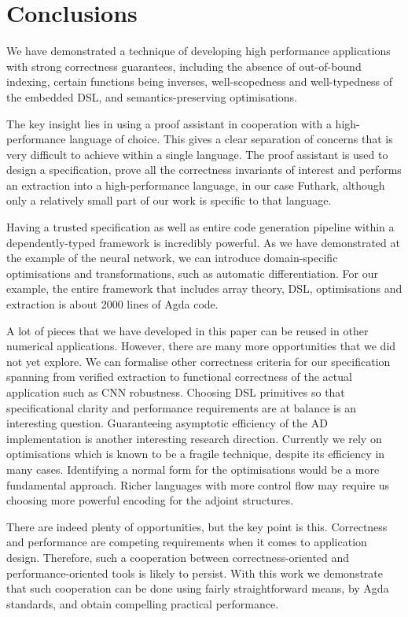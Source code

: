 \section{Conclusions\label{sec:conclusions}}

We have demonstrated a technique of developing high performance
applications with strong correctness guarantees, including the absence
of out-of-bound indexing, certain functions being inverses,
well-scopedness and well-typedness of the embedded DSL, and
semantics-preserving optimisations.

The key insight lies in using a proof assistant in cooperation with a
high-performance language of choice. This gives a clear separation of
concerns that is very difficult to achieve within a single language.
The proof assistant is used to design a specification, prove all the
correctness invariants of interest and performs an extraction into a
high-performance language, in our case Futhark, although only a
relatively small part of our work is specific to that language.

Having a trusted specification as well as entire code generation
pipeline within a dependently-typed framework is incredibly
powerful. As we have demonstrated at the example of the neural
network, we can introduce domain-specific optimisations and
transformations, such as automatic differentiation. For our example,
the entire framework that includes array theory, DSL, optimisations
and extraction is about 2000 lines of Agda code.

A lot of pieces that we have developed in this paper can be reused in
other numerical applications. However, there are many more
opportunities that we did not yet explore. We can formalise other
correctness criteria for our specification spanning from verified
extraction to functional correctness of the actual application such
as CNN robustness.
Choosing DSL primitives so that specificational clarity and
performance requirements are at balance is an interesting question.
Guaranteeing asymptotic efficiency of the AD implementation is another
interesting research direction.  Currently we rely on
optimisations which is known to be a fragile technique, despite its efficiency 
in many cases.  Identifying a normal form for the optimisations would
be a more fundamental approach.  Richer languages with more
control flow may require us choosing more powerful
encoding for the adjoint structures.


There are indeed plenty of opportunities, but the key point is this.
Correctness and performance are competing requirements when it comes
to application design. Therefore, such a cooperation between
correctness-oriented and performance-oriented tools is likely to
persist. With this work we demonstrate that such cooperation can be
done using fairly straightforward means, by Agda standards, and obtain
compelling practical performance.

